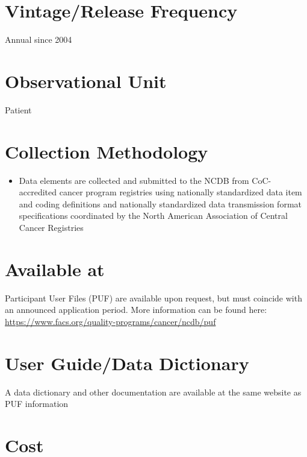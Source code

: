\documentclass[
]{book}
\providecommand{\tightlist}{%
  \setlength{\itemsep}{0pt}\setlength{\parskip}{0pt}}
\begin{document}
\hypertarget{vintagerelease-frequency-45}{%
\section{Vintage/Release Frequency}\label{vintagerelease-frequency-45}}

Annual since 2004

\hypertarget{observational-unit-45}{%
\section{Observational Unit}\label{observational-unit-45}}

Patient

\hypertarget{collection-methodology-45}{%
\section{Collection Methodology}\label{collection-methodology-45}}

\begin{itemize}
\tightlist
\item
  Data elements are collected and submitted to the NCDB from CoC-accredited cancer program registries using nationally standardized data item and coding definitions and nationally standardized data transmission format specifications coordinated by the North American Association of Central Cancer Registries
\end{itemize}

\hypertarget{available-at-45}{%
\section{Available at}\label{available-at-45}}

Participant User Files (PUF) are available upon request, but must coincide with an announced application period. More information can be found here: \url{https://www.facs.org/quality-programs/cancer/ncdb/puf}

\hypertarget{user-guidedata-dictionary-45}{%
\section{User Guide/Data Dictionary}\label{user-guidedata-dictionary-45}}

A data dictionary and other documentation are available at the same website as PUF information

\hypertarget{cost-45}{%
\section{Cost}\label{cost-45}}
\end{document}
